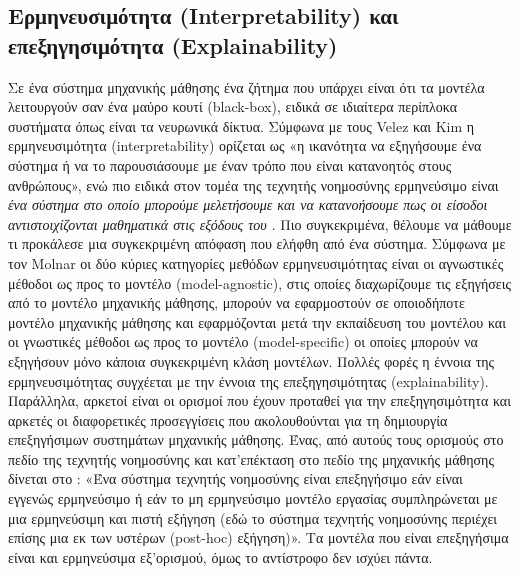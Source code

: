 \subsection{Ερμηνευσιμότητα (Interpretability) και \\ επεξηγησιμότητα (Explainability)}
\noindent Σε ένα σύστημα μηχανικής μάθησης ένα ζήτημα που υπάρχει είναι ότι τα μοντέλα λειτουργούν σαν ένα μαύρο κουτί (black-box), ειδικά σε ιδιαίτερα περίπλοκα συστήματα όπως είναι τα νευρωνικά δίκτυα. Σύμφωνα με τους Velez και Kim \cite{doshi-velezRigorousScienceInterpretable2017} η ερμηνευσιμότητα (interpretability) ορίζεται ως «η ικανότητα να εξηγήσουμε ένα σύστημα ή να το παρουσιάσουμε με έναν τρόπο που είναι κατανοητός στους ανθρώπους», ενώ πιο ειδικά στον τομέα της τεχνητής νοημοσύνης ερμηνεύσιμο είναι \textit{ένα σύστημα στο οποίο μπορούμε μελετήσουμε και να κατανοήσουμε πως οι είσοδοι αντιστοιχίζονται μαθηματικά στις εξόδους του \cite{doranWhatDoesExplainable2018}}. Πιο συγκεκριμένα, θέλουμε να μάθουμε τι προκάλεσε μια συγκεκριμένη απόφαση που ελήφθη από ένα σύστημα.
Σύμφωνα με τον Molnar \cite{molnarInterpretableMachineLearning2019} οι δύο κύριες κατηγορίες μεθόδων ερμηνευσιμότητας είναι οι αγνωστικές μέθοδοι ως προς το μοντέλο (model-agnostic), στις οποίες διαχωρίζουμε τις εξηγήσεις από το μοντέλο μηχανικής μάθησης, μπορούν να εφαρμοστούν σε οποιοδήποτε μοντέλο μηχανικής μάθησης και εφαρμόζονται μετά την εκπαίδευση του μοντέλου και οι γνωστικές μέθοδοι ως προς το μοντέλο (model-specific) οι οποίες μπορούν να εξηγήσουν μόνο κάποια συγκεκριμένη κλάση μοντέλων.
 Πολλές φορές η έννοια της ερμηνευσιμότητας συγχέεται με την έννοια της επεξηγησιμότητας (explainability). Παράλληλα, αρκετοί είναι οι ορισμοί που έχουν προταθεί για την επεξηγησιμότητα και αρκετές οι διαφορετικές προσεγγίσεις που ακολουθούνται για τη δημιουργία επεξηγήσιμων συστημάτων μηχανικής μάθησης. Ένας, από αυτούς τους ορισμούς στο πεδίο της τεχνητής νοημοσύνης και κατ'επέκταση στο πεδίο της μηχανικής μάθησης δίνεται στο \cite{markusRoleExplainabilityCreating2021}: «Ένα σύστημα τεχνητής νοημοσύνης είναι επεξηγήσιμο εάν είναι εγγενώς ερμηνεύσιμο ή εάν το μη ερμηνεύσιμο μοντέλο εργασίας συμπληρώνεται με μια ερμηνεύσιμη και πιστή εξήγηση (εδώ το σύστημα τεχνητής νοημοσύνης περιέχει επίσης μια εκ των υστέρων (post-hoc) εξήγηση)». Τα μοντέλα που είναι επεξηγήσιμα είναι και ερμηνεύσιμα εξ'ορισμού, όμως το αντίστροφο δεν ισχύει πάντα.

